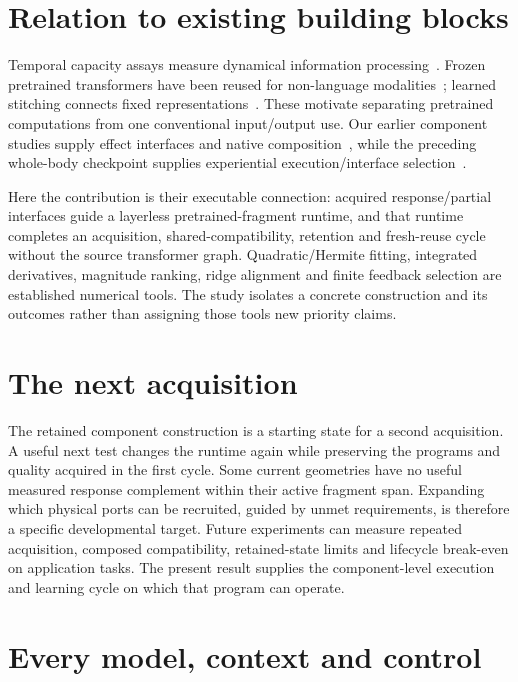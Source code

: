 \documentclass[11pt]{article}
\begin{document}
\section{Relation to existing building blocks}
Temporal capacity assays measure dynamical information processing~\cite{dambre}. Frozen pretrained transformers have been reused for non-language modalities~\cite{lu}; learned stitching connects fixed representations~\cite{stitch}. These motivate separating pretrained computations from one conventional input/output use. Our earlier component studies supply effect interfaces and native composition~\cite{sg1,sg2}, while the preceding whole-body checkpoint supplies experiential execution/interface selection~\cite{sg4}.

Here the contribution is their executable connection: acquired response/partial interfaces guide a layerless pretrained-fragment runtime, and that runtime completes an acquisition, shared-compatibility, retention and fresh-reuse cycle without the source transformer graph. Quadratic/Hermite fitting, integrated derivatives, magnitude ranking, ridge alignment and finite feedback selection are established numerical tools. The study isolates a concrete construction and its outcomes rather than assigning those tools new priority claims.

\section{The next acquisition}
The retained component construction is a starting state for a second acquisition. A useful next test changes the runtime again while preserving the programs and quality acquired in the first cycle. Some current geometries have no useful measured response complement within their active fragment span. Expanding which physical ports can be recruited, guided by unmet requirements, is therefore a specific developmental target. Future experiments can measure repeated acquisition, composed compatibility, retained-state limits and lifecycle break-even on application tasks. The present result supplies the component-level execution and learning cycle on which that program can operate.

\clearpage
\appendix
\section{Every model, context and control}\label{app:cases}
\begin{table}[ht]\centering\scriptsize
\caption{All 24 locked choices. $\Delta Q$ gives absolute fresh-score changes. Old counts use the fixed eligible program set. Zero-action fallbacks are included.}\label{tab:cases}
\end{table}
\end{document}
